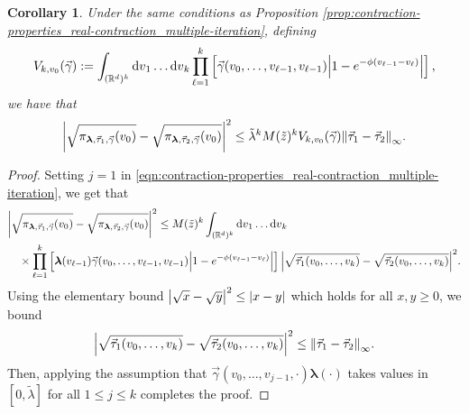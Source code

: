 \documentclass[11pt]{article}
\newcommand{\R}{\mathbb R}
\newcommand{\bl}{\bm{\lambda}}
\newcommand{\tl}{\tilde{\lambda}}
\numberwithin{equation}{section}
\theoremstyle{plain}
\newtheorem{corollary}[theorem]{Corollary}
\theoremstyle{definition}
\theoremstyle{remark}
\begin{document}
\begin{corollary}
\label{cor:contraction-properties_real-contraction_direct-estimate}
Under the same conditions as Proposition \ref{prop:contraction-properties_real-contraction_multiple-iteration}, defining
\begin{equation}
\label{cor:contraction-properties_real-contraction_Vk}
V_{k,v_{0}}(\vec{\gamma})
:=\int_{(\R^{d})^{k}}\dd{v}_{1}\dots\dd{v}_{k}
\prod_{\ell=1}^{k}\left[
\vec{\gamma}(v_{0},\dots,v_{\ell-1},v_{\ell-1})
\abs{1-e^{-\phi(v_{\ell-1}-v_{\ell})}}
\right],
\end{equation}
we have that
\begin{equation}
\label{eqn:contraction-properties_real-contraction_direct-estimate}
\begin{multlined}
\abs{\sqrt{\pi_{\bl,\vec{\tau}_{1},\vec{\gamma}}(v_{0})}-\sqrt{\pi_{\bl,\vec{\tau}_{2},\vec{\gamma}}(v_{0})}}^{2}
\le \tilde{\lambda}^{k} M(\tilde{z})^{k} V_{k,v_{0}}(\vec{\gamma})\norm{\vec{\tau}_{1}-\vec{\tau}_{2}}_{\infty}.
\end{multlined}
\end{equation}
\end{corollary}

\begin{proof}
Setting $j=1$ in \eqref{eqn:contraction-properties_real-contraction_multiple-iteration}, we get that
\begin{equation}
\begin{multlined}
\abs{\sqrt{\pi_{\bl,\vec{\tau}_{1},\vec{\gamma}}(v_{0})}
-\sqrt{\pi_{\bl,\vec{\tau}_{2},\vec{\gamma}}(v_{0})}}^{2}
\le M(\tilde{z})^{k}\int_{(\R^{d})^{k}}\dd{v}_{1}\dots\dd{v}_{k}
\\
\times \prod_{\ell=1}^{k}\left[\bl(v_{\ell-1})\vec{\gamma}(v_{0},\dots,v_{\ell-1},v_{\ell-1})\vphantom{\abs{1-e^{-\phi(v_{\ell-1}-v_{\ell})}}}\abs{1-e^{-\phi(v_{\ell-1}-v_{\ell})}}\right]
\abs{\sqrt{\vec{\tau}_{1}(v_{0},\dots,v_{k})}-\sqrt{\vec{\tau}_{2}(v_{0},\dots,v_{k})}}^{2}.
\end{multlined}
\end{equation}
Using the elementary bound $\abs{\sqrt{x}-\sqrt{y}}^{2}\le\abs{x-y}$ which holds for all $x,y\ge 0$, we bound
\begin{equation}
\abs{\sqrt{\vec{\tau}_{1}(v_{0},\dots,v_{k})}-\sqrt{\vec{\tau}_{2}(v_{0},\dots,v_{k})}}^{2}
\le\norm{\vec{\tau}_{1}-\vec{\tau}_{2}}_{\infty}.
\end{equation}
Then, applying the assumption that $\vec{\gamma}(v_{0},\dots,v_{j-1},\cdot)\bl(\cdot)$ takes values in $[0,\tl]$ for all $1\le j\le k$ completes the proof.
\end{proof}
\end{document}

